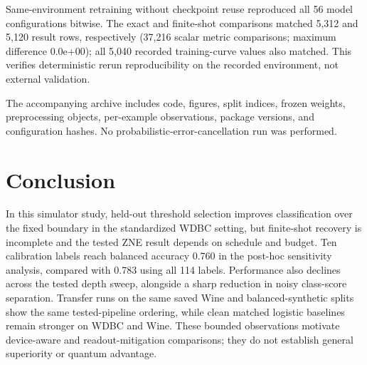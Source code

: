 \documentclass[conference]{IEEEtran}
\begin{document}
Same-environment retraining without checkpoint reuse reproduced all 56 model configurations bitwise. The exact and finite-shot comparisons matched 5,312 and 5,120 result rows, respectively (37,216 scalar metric comparisons; maximum difference 0.0e+00); all 5,040 recorded training-curve values also matched. This verifies deterministic rerun reproducibility on the recorded environment, not external validation.

The accompanying archive includes code, figures, split indices, frozen weights, preprocessing objects, per-example observations, package versions, and configuration hashes. No probabilistic-error-cancellation run was performed.

\section{Conclusion}
In this simulator study, held-out threshold selection improves classification over the fixed boundary in the standardized WDBC setting, but finite-shot recovery is incomplete and the tested ZNE result depends on schedule and budget. Ten calibration labels reach balanced accuracy 0.760 in the post-hoc sensitivity analysis, compared with 0.783 using all 114 labels. Performance also declines across the tested depth sweep, alongside a sharp reduction in noisy class-score separation. Transfer runs on the same saved Wine and balanced-synthetic splits show the same tested-pipeline ordering, while clean matched logistic baselines remain stronger on WDBC and Wine. These bounded observations motivate device-aware and readout-mitigation comparisons; they do not establish general superiority or quantum advantage.
\end{document}
